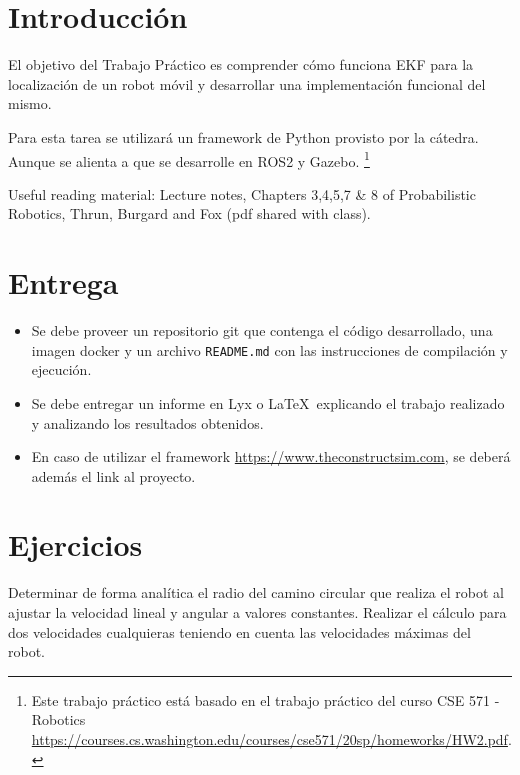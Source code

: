 \documentclass[tp]{lcc}
\begin{document}
	\maketitle
	
	
	\section{Introducción}
	
	El objetivo del Trabajo Práctico es comprender cómo funciona EKF para la localización de un robot móvil y desarrollar una implementación funcional del mismo.
	
	Para esta tarea se utilizará un framework de Python provisto por la cátedra. Aunque se alienta a que se desarrolle en ROS2 y Gazebo. \footnote{Este trabajo práctico está basado en el trabajo práctico del curso CSE 571 - Robotics \url{https://courses.cs.washington.edu/courses/cse571/20sp/homeworks/HW2.pdf}.}
	
	Useful reading material: Lecture notes, Chapters 3,4,5,7 \& 8 of Probabilistic Robotics, Thrun, Burgard and Fox (pdf shared with class).
	
	
	\section{Entrega}
	\begin{itemize}
		\item Se debe proveer un repositorio git que contenga el código desarrollado, una imagen docker y un archivo \lstinline{README.md} con las instrucciones de compilación y ejecución.
		
		\item Se debe entregar un informe en Lyx o \LaTeX\  explicando el trabajo realizado y analizando los resultados obtenidos.
		
		\item En caso de utilizar el framework \url{https://www.theconstructsim.com}, se deberá además el link al proyecto.
	\end{itemize}

	
	\section{Ejercicios}
	
	\ejercicio  Determinar de forma analítica el radio del camino circular que realiza el robot al ajustar la velocidad lineal y angular a valores constantes. Realizar el cálculo para dos velocidades cualquieras teniendo en cuenta las velocidades máximas del robot.
	
\end{document}
